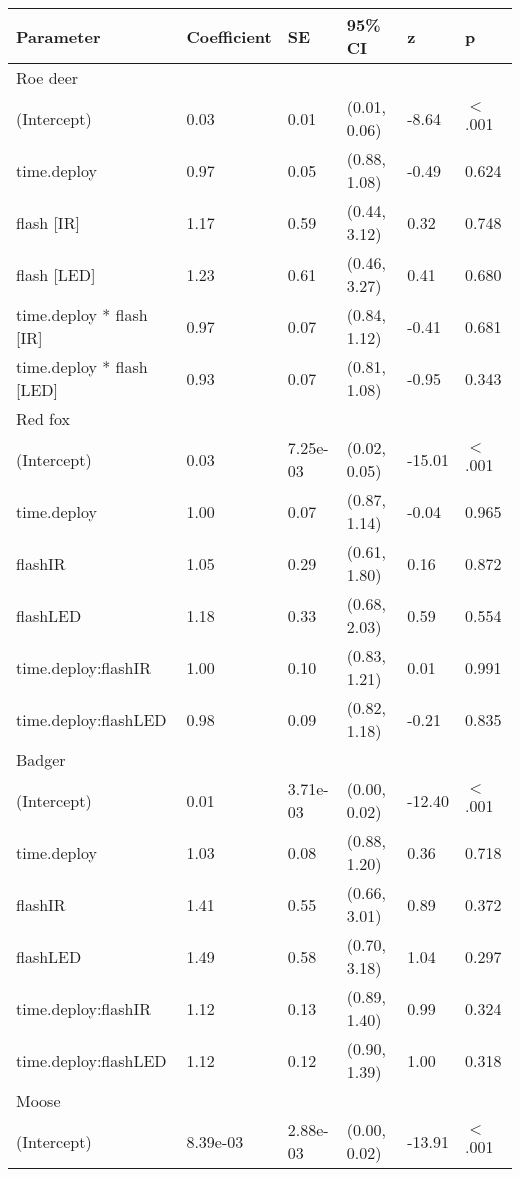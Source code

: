 \begin{table}[ht]
\centering
\begin{tabular}{llllll}
  \hline
Parameter & Coefficient & SE & 95\% CI & z & p \\ 
  \hline
Roe deer &  &  &  &  &        \\ 
  (Intercept) & 0.03 & 0.01 & (0.01, 0.06) & -8.64 & $<$ .001 \\ 
  time.deploy & 0.97 & 0.05 & (0.88, 1.08) & -0.49 & 0.624  \\ 
  flash [IR] & 1.17 & 0.59 & (0.44, 3.12) & 0.32 & 0.748  \\ 
  flash [LED] & 1.23 & 0.61 & (0.46, 3.27) & 0.41 & 0.680  \\ 
  time.deploy * flash [IR] & 0.97 & 0.07 & (0.84, 1.12) & -0.41 & 0.681  \\ 
  time.deploy * flash [LED] & 0.93 & 0.07 & (0.81, 1.08) & -0.95 & 0.343  \\ 
  Red fox &  &  &  &  &        \\ 
  (Intercept) & 0.03 & 7.25e-03 & (0.02, 0.05) & -15.01 & $<$ .001 \\ 
  time.deploy & 1.00 & 0.07 & (0.87, 1.14) & -0.04 & 0.965  \\ 
  flashIR & 1.05 & 0.29 & (0.61, 1.80) & 0.16 & 0.872  \\ 
  flashLED & 1.18 & 0.33 & (0.68, 2.03) & 0.59 & 0.554  \\ 
  time.deploy:flashIR & 1.00 & 0.10 & (0.83, 1.21) & 0.01 & 0.991  \\ 
  time.deploy:flashLED & 0.98 & 0.09 & (0.82, 1.18) & -0.21 & 0.835  \\ 
  Badger &  &  &  &  &        \\ 
  (Intercept) & 0.01 & 3.71e-03 & (0.00, 0.02) & -12.40 & $<$ .001 \\ 
  time.deploy & 1.03 & 0.08 & (0.88, 1.20) & 0.36 & 0.718  \\ 
  flashIR & 1.41 & 0.55 & (0.66, 3.01) & 0.89 & 0.372  \\ 
  flashLED & 1.49 & 0.58 & (0.70, 3.18) & 1.04 & 0.297  \\ 
  time.deploy:flashIR & 1.12 & 0.13 & (0.89, 1.40) & 0.99 & 0.324  \\ 
  time.deploy:flashLED & 1.12 & 0.12 & (0.90, 1.39) & 1.00 & 0.318  \\ 
  Moose &  &  &  &  &        \\ 
  (Intercept) & 8.39e-03 & 2.88e-03 & (0.00, 0.02) & -13.91 & $<$ .001 \\ 

\end{tabular}
\end{table}
